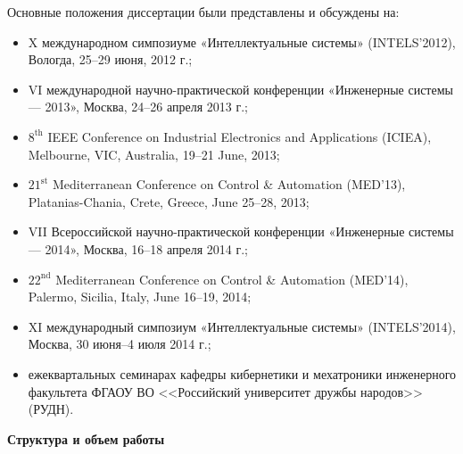 Основные положения диссертации были представлены и обсуждены на:
\begin{itemize}
    \item X международном симпозиуме «Интеллектуальные системы» (INTELS'2012), Вологда, 25--29 июня, 2012 г.;
    \item VI международной научно-практической конференции «Инженерные системы — 2013», Москва, 24--26 апреля 2013 г.;
    \item $8^{\text{th}}$ IEEE Conference on Industrial Electronics and Applications (ICIEA), Melbourne, VIC, Australia, 19--21 June, 2013;
    \item $21^{\text{st}}$ Mediterranean Conference on Control \& Automation (MED'13), Platanias-Chania, Crete, Greece, June 25--28, 2013;
    \item VII Всероссийской научно-практической конференции «Инженерные системы — 2014», Москва, 16--18 апреля 2014 г.;
    \item $22^{\text{nd}}$ Mediterranean Conference on Control \& Automation (MED'14), Palermo, Sicilia, Italy, June 16--19, 2014;
    \item XI международный симпозиум «Интеллектуальные системы» (INTELS'2014), Москва, 30 июня--4 июля 2014 г.;
    \item ежеквартальных семинарах кафедры кибернетики и мехатроники инженерного факультета ФГАОУ ВО <<Российский университет дружбы народов>> (РУДН).
\end{itemize}

\textbf{Структура и объем работы}

\clearpage